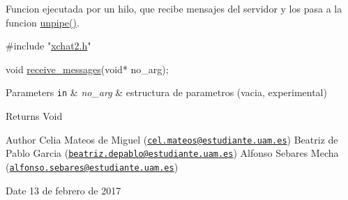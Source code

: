 Funcion ejecutada por un hilo, que recibe mensajes del servidor y los pasa a la funcion \hyperlink{xchat2_8h_a63f7dc08db4a2318cb526eee804709b3}{unpipe()}.


\begin{DoxyCode}
\textcolor{preprocessor}{#include "\hyperlink{xchat2_8h}{xchat2.h}"}

\textcolor{keywordtype}{void} \hyperlink{xchat2_8h_a7230d43b8458797c679e7180bf1fda90}{receive\_messages}(\textcolor{keywordtype}{void}* no\_arg);
\end{DoxyCode}



\begin{DoxyParams}[1]{Parameters}
\mbox{\tt in}  & {\em no\-\_\-arg} & estructura de parametros (vacia, experimental)\\
\hline
\end{DoxyParams}
\begin{DoxyReturn}{Returns}
Void
\end{DoxyReturn}
\begin{DoxyAuthor}{Author}
Celia Mateos de Miguel (\href{mailto:cel.mateos@estudiante.uam.es}{\tt cel.\-mateos@estudiante.\-uam.\-es}) Beatriz de Pablo Garcia (\href{mailto:beatriz.depablo@estudiante.uam.es}{\tt beatriz.\-depablo@estudiante.\-uam.\-es}) Alfonso Sebares Mecha (\href{mailto:alfonso.sebares@estudiante.uam.es}{\tt alfonso.\-sebares@estudiante.\-uam.\-es})
\end{DoxyAuthor}
\begin{DoxyDate}{Date}
13 de febrero de 2017
\end{DoxyDate}


 